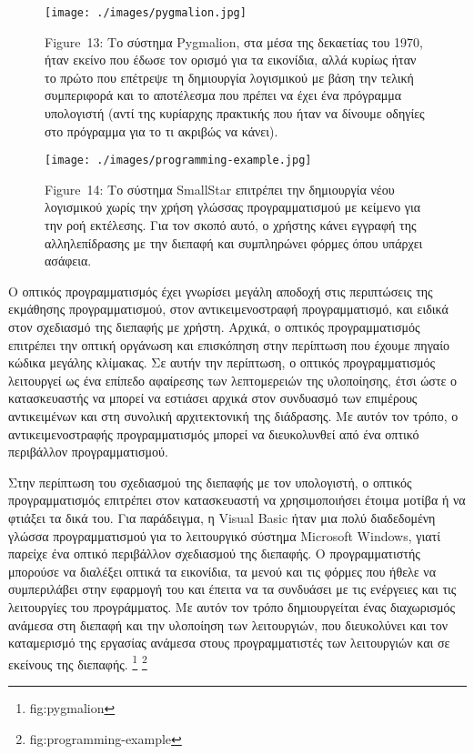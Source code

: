 \documentclass[
]{article}
\begin{document}
\leavevmode{}%
\begin{figure}
\hypertarget{fig:pygmalion}{%
\centering
\texttt{[image: ./images/pygmalion.jpg]}
\caption{Figure~13: Το σύστημα Pygmalion, στα μέσα της δεκαετίας του
1970, ήταν εκείνο που έδωσε τον ορισμό για τα εικονίδια, αλλά κυρίως
ήταν το πρώτο που επέτρεψε τη δημιουργία λογισμικού με βάση την τελική
συμπεριφορά και το αποτέλεσμα που πρέπει να έχει ένα πρόγραμμα
υπολογιστή (αντί της κυρίαρχης πρακτικής που ήταν να δίνουμε οδηγίες στο
πρόγραμμα για το τι ακριβώς να κάνει).}\label{fig:pygmalion}
}
\end{figure}

\leavevmode{}%
\begin{figure}
\hypertarget{fig:programming-example}{%
\centering
\texttt{[image: ./images/programming-example.jpg]}
\caption{Figure~14: Το σύστημα SmallStar επιτρέπει την δημιουργία νέου
λογισμικού χωρίς την χρήση γλώσσας προγραμματισμού με κείμενο για την
ροή εκτέλεσης. Για τον σκοπό αυτό, ο χρήστης κάνει εγγραφή της
αλληλεπίδρασης με την διεπαφή και συμπληρώνει φόρμες όπου υπάρχει
ασάφεια.}\label{fig:programming-example}
}
\end{figure}

Ο οπτικός προγραμματισμός έχει γνωρίσει μεγάλη αποδοχή στις περιπτώσεις
της εκμάθησης προγραμματισμού, στον αντικειμενοστραφή προγραμματισμό,
και ειδικά στον σχεδιασμό της διεπαφής με χρήστη. Αρχικά, ο οπτικός
προγραμματισμός επιτρέπει την οπτική οργάνωση και επισκόπηση στην
περίπτωση που έχουμε πηγαίο κώδικα μεγάλης κλίμακας. Σε αυτήν την
περίπτωση, ο οπτικός προγραμματισμός λειτουργεί ως ένα επίπεδο αφαίρεσης
των λεπτομερειών της υλοποίησης, έτσι ώστε ο κατασκευαστής να μπορεί να
εστιάσει αρχικά στον συνδυασμό των επιμέρους αντικειμένων και στη
συνολική αρχιτεκτονική της διάδρασης. Με αυτόν τον τρόπο, ο
αντικειμενοστραφής προγραμματισμός μπορεί να διευκολυνθεί από ένα οπτικό
περιβάλλον προγραμματισμού.

Στην περίπτωση του σχεδιασμού της διεπαφής με τον υπολογιστή, ο οπτικός
προγραμματισμός επιτρέπει στον κατασκευαστή να χρησιμοποιήσει έτοιμα
μοτίβα ή να φτιάξει τα δικά του. Για παράδειγμα, η Visual Basic ήταν μια
πολύ διαδεδομένη γλώσσα προγραμματισμού για το λειτουργικό σύστημα
Microsoft Windows, γιατί παρείχε ένα οπτικό περιβάλλον σχεδιασμού της
διεπαφής. Ο προγραμματιστής μπορούσε να διαλέξει οπτικά τα εικονίδια, τα
μενού και τις φόρμες που ήθελε να συμπεριλάβει στην εφαρμογή του και
έπειτα να τα συνδυάσει με τις ενέργειες και τις λειτουργίες του
προγράμματος. Με αυτόν τον τρόπο δημιουργείται ένας διαχωρισμός ανάμεσα
στη διεπαφή και την υλοποίηση των λειτουργιών, που διευκολύνει και τον
καταμερισμό της εργασίας ανάμεσα στους προγραμματιστές των λειτουργιών
και σε εκείνους της διεπαφής. \footnote{fig:pygmalion} \footnote{fig:programming-example}
\end{document}
